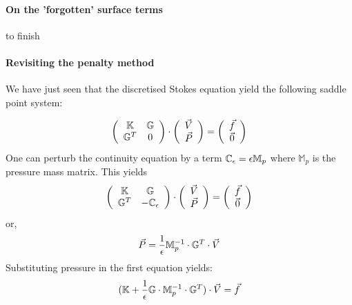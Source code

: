 \paragraph{On the 'forgotten' surface terms}

to finish

\paragraph{Revisiting the penalty method}

We have just seen that the discretised Stokes equation yield the 
following saddle point system:


\[
\left( \begin{array}{cc}
{\mathbb{K}} & {\mathbb{G}}  \\ 
{\mathbb{G}}^T & 0 
\end{array} \right) \cdot
\left( \begin{array}{c}  \vec{V} \\ \vec{P}  \end{array} \right) = 
\left( \begin{array}{c}  \vec{f} \\ \vec{0}  \end{array} \right) 
\]
One can perturb the continuity equation 
by a term ${\mathbb{C}}_\epsilon = \epsilon \mathbb{M}_p$
where $\mathbb{M}_p$ is the pressure mass matrix.
This yields
\[
\left( \begin{array}{cc}
{\mathbb{K}} & {\mathbb{G}}  \\ {\mathbb{G}}^T & -\mathbb{C}_\epsilon
\end{array} \right) \cdot
\left( \begin{array}{c}  \vec{V} \\ \vec{P}  \end{array} \right) = 
\left( \begin{array}{c}  \vec{f} \\ \vec{0}  \end{array} \right) 
\]
or,
\[
\vec{P}= \frac{1}{\epsilon} \mathbb{M}_p^{-1} \cdot  {\mathbb{G}}^T \cdot \vec{V}
\]
Substituting pressure in the first equation yields:
\begin{equation}
({\mathbb{K}} + \frac{1}{\epsilon} {\mathbb{G}} \cdot \mathbb{M}_p^{-1} \cdot {\mathbb{G}}^T ) \cdot \vec{V} = \vec{f} 
\label{eqdpf}
\end{equation}

